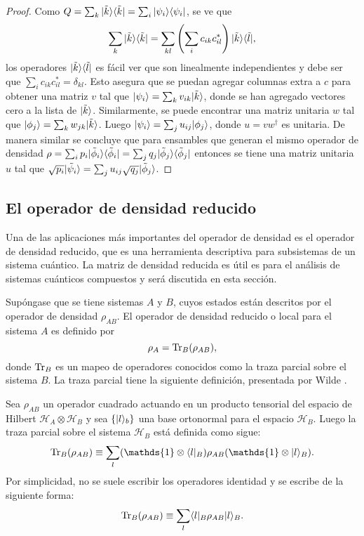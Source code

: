 \begin{proof}
Como  $Q=\sum_k  |\tilde{k}\rangle \langle \tilde{k}|=\sum_{i}|\psi_i\rangle \langle\psi_i|$, se ve
que \[\sum_k |\tilde{k}\rangle \langle \tilde{k}|=\sum_{kl} \left(\sum_i
c_{ik}c_{il}^{*}\right)|\tilde{k}\rangle \langle \tilde{l}|,\] los operadores $|\tilde{k}
\rangle \langle \tilde{l}|$ es fácil ver  que son linealmente independientes y debe ser
que $\sum_i c_{ik}c_{il}^{*}=\delta_{kl}$. Esto asegura que se puedan agregar
columnas extra a $c$ para obtener una matriz $v$ tal que
$|\psi_i\rangle=\sum_{k}v_{ik}|\tilde{k}\rangle  $, donde se han agregado  vectores cero a la
lista de $|\tilde{k}\rangle$. Similarmente, se puede encontrar una matriz unitaria
$w$ tal que $|\phi_j\rangle=\sum_{k}w_{jk}|\tilde{k}\rangle$. Luego $|\psi_i\rangle=\sum_j
u_{ij}|\phi_j\rangle$, donde  $u=vw^\dagger$ es unitaria. De manera similar se concluye que para ensambles que generan el mismo operador de densidad $\rho=\sum_i p_i |\tilde{\phi}_i\rangle \langle\tilde{\phi}_i|= \sum_j q_j|\tilde{\phi}_j \rangle \langle\tilde{\phi}_j| $ entonces se tiene una matriz unitaria $u$ tal que  $\sqrt{p_i}|\tilde{\psi}_i\rangle=\sum_{j} u_{ij} \sqrt{q_j}|\tilde{\phi}_j\rangle$.
\end{proof}

\subsection{El operador de densidad reducido} %

Una de las aplicaciones más importantes del operador de densidad es el operador
de densidad reducido, que es una herramienta descriptiva para subsistemas de un
sistema cuántico. La matriz de densidad reducida es útil es
para el análisis de sistemas cuánticos compuestos y será discutida
en esta sección. 


Supóngase que se tiene sistemas $A$ y $B$, cuyos estados están descritos por el
operador de densidad $\rho_{AB}$. El operador de densidad reducido o local para
el sistema $A$ es definido por  
\begin{equation}
	\rho_A={\rm Tr}_B(\rho_{AB}),
\end{equation} 
donde ${\rm Tr}_B$ es un mapeo de operadores conocidos como la traza parcial sobre
el sistema $B$. La traza parcial tiene la siguiente definición, presentada
por Wilde {\cite{wilde2011classical}}.

\begin{definition}
Sea  $ \rho_{AB}$ un operador cuadrado actuando en un producto tensorial del
espacio de Hilbert $\mathcal{H}_A \otimes \mathcal{ H}_B$ y sea $\{|l\rangle_b\}$
una base ortonormal para el espacio $\mathcal{H}_B$. Luego la traza parcial
sobre el sistema $\mathcal{H}_B$ está definida como sigue: 
\begin{equation}
		\tr_B(\rho_{AB})\equiv\sum_{l} (\mathds{1}\otimes\la l|_B)\rho_{AB}(\mathds{1}\otimes|l\ra_B).	
\end{equation} 
Por simplicidad, no se suele escribir los operadores identidad y se escribe de la siguiente forma:
\begin{equation}
	{\rm Tr}_B(\rho_{AB})\equiv\sum_{l} \langle l|_B\rho_{AB}|l\rangle_B.
\end{equation}
\end{definition}

